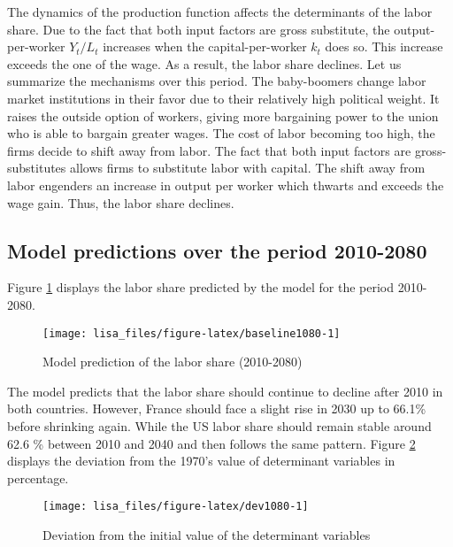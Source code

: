 \documentclass[
]{article}
\begin{document}
The dynamics of the production function affects the determinants of the labor share.
Due to the fact that both input factors are gross substitute, the output-per-worker \(Y_t/L_t\) increases when the capital-per-worker \(k_t\) does so. This increase exceeds the one of the wage. As a result, the labor share declines.
Let us summarize the mechanisms over this period. The baby-boomers change labor market institutions in their favor due to their relatively high political weight. It raises the outside option of workers, giving more bargaining power to the union who is able to bargain greater wages. The cost of labor becoming too high, the firms decide to shift away from labor. The fact that both input factors are gross-substitutes allows firms to substitute labor with capital. The shift away from labor engenders an increase in output per worker which thwarts and exceeds the wage gain. Thus, the labor share declines.

\hypertarget{pred1080}{%
\subsection{Model predictions over the period 2010-2080}\label{pred1080}}

Figure \ref{fig:baseline1080} displays the labor share predicted by the model for the period 2010-2080.

\begin{figure}[!tb]

{\centering \texttt{[image: lisa\_files/figure-latex/baseline1080-1]} 

}

\caption{Model prediction of the labor share (2010-2080)}\label{fig:baseline1080}
\end{figure}

The model predicts that the labor share should continue to decline after 2010 in both countries. However, France should face a slight rise in 2030 up to 66.1\% before shrinking again. While the US labor share should remain stable around 62.6 \% between 2010 and 2040 and then follows the same pattern. Figure \ref{fig:dev1080} displays the deviation from the 1970's value of determinant variables in percentage.

\begin{figure}[!tb]

{\centering \texttt{[image: lisa\_files/figure-latex/dev1080-1]} 

}

\caption{Deviation from the initial value of the determinant variables}\label{fig:dev1080}
\end{figure}
\end{document}
